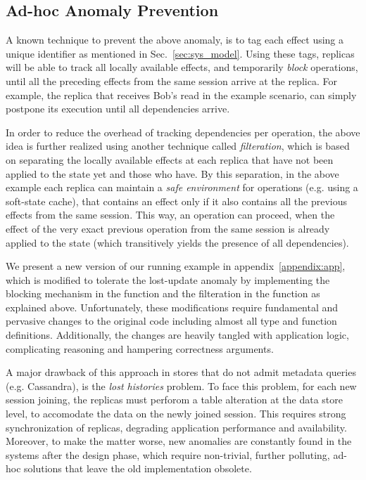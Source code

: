 %
\subsection{Ad-hoc Anomaly Prevention}
A known technique to prevent the above anomaly, 
is to tag each effect using a unique identifier  as mentioned in
Sec.~\ref{sec:sys_model}. Using these tags, replicas will be able to
track all locally available effects, and temporarily \emph{block}
operations, until all the preceding effects from the same session 
arrive at the replica. For example, the replica  that receives Bob's read
in the example scenario, can simply postpone its execution until all
dependencies arrive.

In order to reduce the overhead of tracking dependencies per
operation, the above idea is further realized using another technique
called \emph{filteration}, which is based on separating the
locally available effects at each replica that have not been applied to
the state yet and those who have. By this separation, in the
above example each replica can
maintain a \emph{safe environment} for operations (e.g. using a soft-state
cache), that contains an effect only if it also contains all the
previous effects from the same session. This way, an operation 
can proceed, when the effect of the very exact previous operation from
the same session is already
applied to the state (which transitively yields the presence of all
dependencies).

We present a new version of our running example
in appendix~\ref{appendix:app}, which is modified to
tolerate the lost-update anomaly by implementing the blocking mechanism
in the \readC{} function and the filteration in the \applyC{} function
as explained above. Unfortunately, these modifications require fundamental and pervasive
changes to the original code including almost all type and function
definitions.  
Additionally, the changes are heavily tangled with application logic, 
complicating reasoning and hampering correctness arguments.

A major drawback of this approach in
stores that do not admit metadata queries (e.g. Cassandra), 
is the \emph{lost histories}\cite{bolton} problem. To face this problem,
for each new session joining, the replicas must perforom a table
alteration at the data store level, to accomodate the data on the newly
joined session.  This  requires strong synchronization of
replicas, degrading application performance and availability.
Moreover, to make the matter worse, new anomalies are constantly
found
in the
systems after the design phase, which require non-trivial, further polluting,  ad-hoc solutions
that leave the old implementation obsolete.









